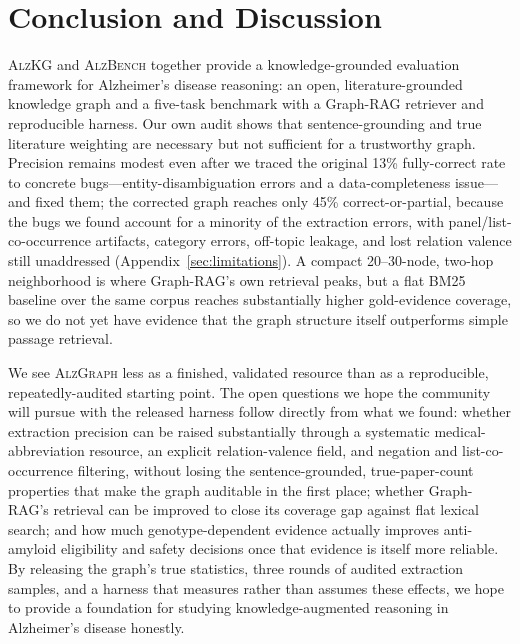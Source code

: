 \documentclass{article}
\begin{document}
\section{Conclusion and Discussion}
\textsc{AlzKG} and \textsc{AlzBench} together provide a knowledge-grounded evaluation framework for Alzheimer's disease reasoning: an open, literature-grounded knowledge graph and a five-task benchmark with a Graph-RAG retriever and reproducible harness. Our own audit shows that sentence-grounding and true literature weighting are necessary but not sufficient for a trustworthy graph. Precision remains modest even after we traced the original 13\% fully-correct rate to concrete bugs---entity-disambiguation errors and a data-completeness issue---and fixed them; the corrected graph reaches only 45\% correct-or-partial, because the bugs we found account for a minority of the extraction errors, with panel/list-co-occurrence artifacts, category errors, off-topic leakage, and lost relation valence still unaddressed (Appendix~\ref{sec:limitations}). A compact 20--30-node, two-hop neighborhood is where Graph-RAG's own retrieval peaks, but a flat BM25 baseline over the same corpus reaches substantially higher gold-evidence coverage, so we do not yet have evidence that the graph structure itself outperforms simple passage retrieval.

We see \textsc{AlzGraph} less as a finished, validated resource than as a reproducible, repeatedly-audited starting point. The open questions we hope the community will pursue with the released harness follow directly from what we found: whether extraction precision can be raised substantially through a systematic medical-abbreviation resource, an explicit relation-valence field, and negation and list-co-occurrence filtering, without losing the sentence-grounded, true-paper-count properties that make the graph auditable in the first place; whether Graph-RAG's retrieval can be improved to close its coverage gap against flat lexical search; and how much genotype-dependent evidence actually improves anti-amyloid eligibility and safety decisions once that evidence is itself more reliable. By releasing the graph's true statistics, three rounds of audited extraction samples, and a harness that measures rather than assumes these effects, we hope to provide a foundation for studying knowledge-augmented reasoning in Alzheimer's disease honestly.




\newpage
\appendix
\end{document}
